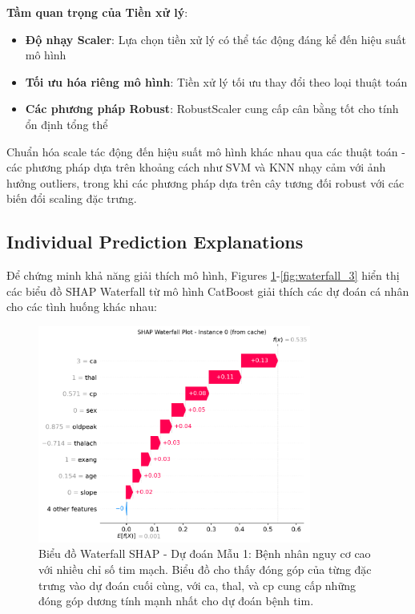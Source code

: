 \textbf{Tầm quan trọng của Tiền xử lý}:
\begin{itemize}
    \item \textbf{Độ nhạy Scaler}: Lựa chọn tiền xử lý có thể tác động đáng kể đến hiệu suất mô hình
    \item \textbf{Tối ưu hóa riêng mô hình}: Tiền xử lý tối ưu thay đổi theo loại thuật toán
    \item \textbf{Các phương pháp Robust}: RobustScaler cung cấp cân bằng tốt cho tính ổn định tổng thể
\end{itemize}
Chuẩn hóa scale tác động đến hiệu suất mô hình khác nhau qua các thuật toán - các phương pháp dựa trên khoảng cách như SVM và KNN nhạy cảm với ảnh hưởng outliers, trong khi các phương pháp dựa trên cây tương đối robust với các biến đổi scaling đặc trưng.

\subsection{Individual Prediction Explanations}

Để chứng minh khả năng giải thích mô hình, Figures \ref{fig:waterfall_1}-\ref{fig:waterfall_3} hiển thị các biểu đồ SHAP Waterfall từ mô hình CatBoost giải thích các dự đoán cá nhân cho các tình huống khác nhau:

\begin{figure}[H]
\centering
\includegraphics[width=0.8\textwidth]{Result/cleveland_dataset/Catboost/SHAP/Waterfall 1.png}
\caption{Biểu đồ Waterfall SHAP - Dự đoán Mẫu 1: Bệnh nhân nguy cơ cao với nhiều chỉ số tim mạch. Biểu đồ cho thấy đóng góp của từng đặc trưng vào dự đoán cuối cùng, với ca, thal, và cp cung cấp những đóng góp dương tính mạnh nhất cho dự đoán bệnh tim.}
\label{fig:waterfall_1}
\end{figure}

